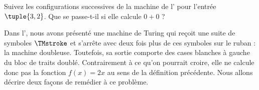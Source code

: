 \documentclass[../../../include/open-logic-section]{subfiles}
\begin{document}
\begin{prob}
Suivez les configurations successives de la machine de
l' pour l'entrée~$\tuple{3,2}$.
Que se passe-t-il si elle calcule $0+0$ ?
\end{prob}

\begin{explain}
Dans l', nous avons présenté une machine
de Turing qui reçoit une suite de symboles $\TMstroke$ et
s'arrête avec deux fois plus de ces symboles sur le ruban :
la machine doubleuse. Toutefois, sa sortie comporte des cases
blanches à gauche du bloc de traits doublé. Contrairement à ce
qu'on pourrait croire, elle ne calcule donc pas la fonction
$f(x)=2x$ au sens de la définition précédente. Nous allons
décrire deux façons de remédier à ce problème.
\end{explain}
\end{document}
